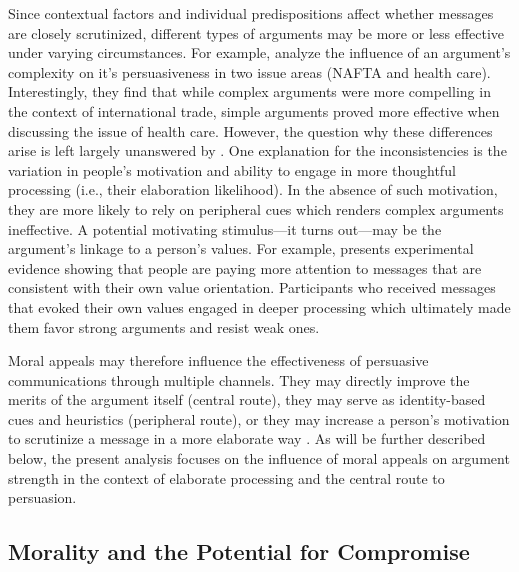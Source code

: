 Since contextual factors and individual predispositions affect whether messages are closely scrutinized, different types of arguments may be more or less effective under varying circumstances. For example, \citet{cobb1997changing} analyze the influence of an argument's complexity on it's persuasiveness in two issue areas (NAFTA and health care). Interestingly, they find that while complex arguments were more compelling in the context of international trade, simple arguments proved more effective when discussing the issue of health care. However, the question why these differences arise is left largely unanswered by \citet{cobb1997changing}. One explanation for the inconsistencies is the variation in people's motivation and ability to engage in more thoughtful processing (i.e., their elaboration likelihood). In the absence of such motivation, they are more likely to rely on peripheral cues which renders complex arguments ineffective. A potential motivating stimulus---it turns out---may be the argument's linkage to a person's values. For example, \citet{nelson2005values} presents experimental evidence showing that people are paying more attention to messages that are consistent with their own value orientation. Participants who received messages that evoked their own values engaged in deeper processing which ultimately made them favor strong arguments and resist weak ones.

Moral appeals may therefore influence the effectiveness of persuasive communications through multiple channels. They may directly improve the merits of the argument itself (central route), they may serve as identity-based cues and heuristics (peripheral route), or they may increase a person's motivation to scrutinize a message in a more elaborate way \citep[see also][]{petty1986elaboration}. As will be further described below, the present analysis focuses on the influence of moral appeals on argument strength in the context of elaborate processing and the central route to persuasion.



\subsection{Morality and the Potential for Compromise}


